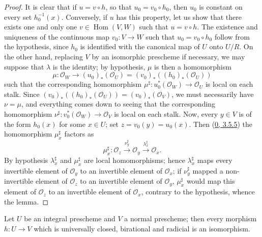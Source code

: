 \begin{proof}
It is clear that if $u=v\circ h$, so that $u_0=v_0\circ h_0$, then $u_0$ is
constant on every set $h_0^{-1}(x)$. Conversely, if $u$ has this
property, let us show that there exists one and only one
$v\in\operatorname{Hom}(V,W)$ such that $u=v\circ h$. The existence and
uniqueness of the continuous map $v_0:V\to W$ such that $u_0=v_0\circ h_0$
follow from the hypothesis, since $h_0$ is identified with the canonical
map of $U$ onto $U/R$. On the other hand, replacing $V$ by an isomorphic
prescheme if necessary, we may suppose that $\lambda$ is the identity; by
hypothesis, $\mu$ is then a homomorphism
\[
  \mu:\mathcal{O}_W\longrightarrow(u_0)_*(\mathcal{O}_U)
  =(v_0)_*((h_0)_*(\mathcal{O}_U))
\]
such that the corresponding homomorphism
$\mu^\sharp:u_0^*(\mathcal{O}_W)\to\mathcal{O}_U$ is local on each
stalk. Since
$(v_0)_*((h_0)_*(\mathcal{O}_U))=(v_0)_*(\mathcal{O}_V)$, we must
necessarily have $\nu=\mu$, and everything comes down to seeing that the
corresponding homomorphism $\nu^\sharp:v_0^*(\mathcal{O}_W)\to\mathcal{O}_V$
is local on each stalk. Now, every $y\in V$ is of the form $h_0(x)$ for some
$x\in U$; set $z=v_0(y)=u_0(x)$. Then
(\hyperref[0.3.5.5]{0, 3.5.5}) the homomorphism $\mu_x^\sharp$ factors
as
\[
  \mu_x^\sharp:\mathcal{O}_z
  \xrightarrow{\nu_y^\sharp}\mathcal{O}_y
  \xrightarrow{\lambda_x^\sharp}\mathcal{O}_x.
\]
By hypothesis $\lambda_x^\sharp$ and $\mu_x^\sharp$ are local
homomorphisms; hence $\lambda_x^\sharp$ maps every invertible element of
$\mathcal{O}_y$ to an invertible element of $\mathcal{O}_x$; if
$\nu_y^\sharp$ mapped a non-invertible element of $\mathcal{O}_z$ to
an invertible element of $\mathcal{O}_y$, $\mu_x^\sharp$ would map this
element of $\mathcal{O}_z$ to an invertible element of $\mathcal{O}_x$,
contrary to the hypothesis, whence the lemma.
\end{proof}

\begin{corollary}[8.11.2]
\label{II.8.11.2}
Let $U$ be an integral prescheme and $V$ a normal prescheme; then every
morphism $h:U\to V$ which is universally closed, birational and radicial is an
isomorphism.
\end{corollary}

